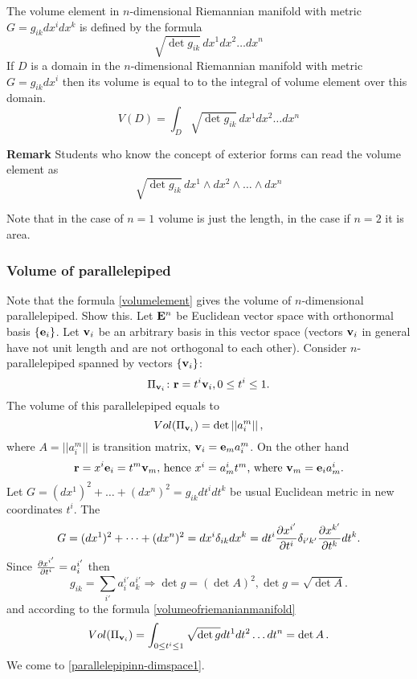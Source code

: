 \documentclass[12pt]{article}
\theoremstyle{theorem}
\numberwithin{equation}{section}
\begin{document}
   The volume element   in $n$-dimensional Riemannian manifold with metric $G=g_{ik}dx^i
    dx^k$ is defined by the formula
     \begin{equation}\label{volumelement}
  \sqrt {\det g_{ik}}\,dx^1dx^2\dots dx^n
\end{equation}
    If $D$ is a domain in the $n$-dimensional Riemannian manifold with metric
    $G=g_{ik}dx^i$
    then its volume is equal to to the integral of volume element over this domain.
          \begin{equation}\label{volumeofriemanianmanifold}
  V(D)=\int_D \sqrt {\det g_{ik}}\,dx^1dx^2\dots dx^n
\end{equation}

{\bf Remark} Students who know the concept of exterior forms
 can read the volume element as
     \begin{equation}\label{volumelement2}
  \sqrt {\det g_{ik}}\,dx^1\wedge dx^2\wedge \dots \wedge dx^n
\end{equation}

\bigskip

     Note that in the case of $n=1$ volume is just the length, in the case
     if $n=2$ it is area.

\subsubsection {Volume of parallelepiped}

  Note that the formula \eqref{volumelement} gives the volume of $n$-dimensional parallelepiped.
  Show this.  Let ${\bf E}^n$ be Euclidean
  vector space with orthonormal basis $\{{\bf e}_i\}$. Let
  ${{\bf v}_i}$ be an arbitrary basis in this vector space (vectors ${\bf v}_i$ in general have not unit length and
  are not orthogonal to each other). Consider $n$-parallelepiped spanned by vectors $\{{\bf v}_i\}$:
                 $$
     \Pi_{{\bf v}_i}\colon  {\bf r}=t^i{\bf v}_i, 0\leq t^i\leq 1.
                 $$
  The volume of this parallelepiped equals to
             \begin{equation}\label{parallelepipinn-dimspace1}
                Vol(\Pi_{{\bf v}_i})=\det ||a_i^m||\,,
             \end{equation}
where $A=||a_i^m||$ is  transition matrix, ${\bf v}_i={\bf e}_m a_i^m$.
On the other hand
             $$
{\bf r}=x^i{\bf e}_i=t^m{\bf v}_m, \,
\hbox{hence $x^i=a^i_m t^m$, where ${\bf v}_m={\bf e}_ia^i_m$.}
             $$
Let $G=(dx^1)^2+\dots+(dx^n)^2=g_{ik}dt^idt^k$ be usual Euclidean metric in new coordinates $t^i$. The
          $$
     G=(dx^1)^2+\dots+(dx^n)^2=dx^i\delta_{ik}dx^k=
     dt^{i}{\partial x^{i'}\over \partial t^{i}}\delta_{i'k'}{\partial x^{k'}\over \partial t^{k}}dt^{k}.
          $$
Since   ${\partial x^{i'}\over \partial t^{i}}=a^{i'}_i$ then
                          $$
g_{ik}=\sum_{i'}a^{i'}_i a^{i'}_k\Rightarrow \det g=(\det A)^2, \det g=\sqrt {\det A}.
  $$
and according to the formula \eqref{volumeofriemanianmanifold}
          $$
      Vol(\Pi_{{\bf v}_i})=\int_{0\leq t^i\leq 1} \sqrt{\det g} dt^1dt^2\dots dt^n=\det A\,.
          $$
We come to \eqref{parallelepipinn-dimspace1}.
\m
\end{document}
